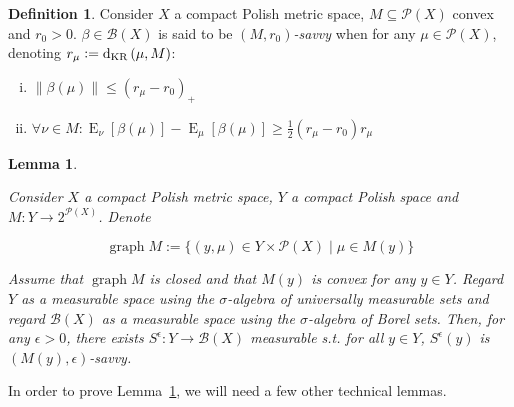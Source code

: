 \documentclass[11pt]{article}
\theoremstyle{definition}
\newtheorem{definition}{Definition}%
\theoremstyle{plain}
\newtheorem{lemma}{Lemma}%
\newcommand{\N}[1]{\lVert #1 \rVert}
\DeclareMathOperator{\E}{E}
\DeclareMathOperator{\Gr}{graph}
\newcommand{\PM}{\mathcal{P}}
\newcommand{\DKR}{\operatorname{d}_{\textnormal{KR}}}
\newcommand{\Gm}{\mathcal{B}}
\begin{document}
\begin{samepage}
\begin{definition}

Consider $X$ a compact Polish metric space, $M \subseteq \PM\left(X\right)$ convex and $r_0 > 0$. $\beta \in \Gm\left(X\right)$ is said to be \emph{$\left(M,r_0\right)$-savvy} when for any $\mu \in \PM\left(X\right)$, denoting $r_\mu:=\DKR\left(\mu,M\right)$:

\begin{enumerate}[i.]

\item $\N{\beta\left(\mu\right)} \leq \left(r_\mu - r_0\right)_+$
\item $\forall \nu \in M: \E_\nu\left[\beta\left(\mu\right)\right] - \E_\mu\left[\beta\left(\mu\right)\right] \geq \frac{1}{2}\left(r_\mu - r_0\right) r_\mu$

\end{enumerate}

\end{definition}
\end{samepage}

\begin{samepage}
\begin{lemma}
\label{lmm:savvy}

Consider $X$ a compact Polish metric space, $Y$ a compact Polish space and $M: Y \rightarrow 2^{\PM\left(X\right)}$. Denote

\begin{equation*}
\Gr{M}:=\{\left(y, \mu\right) \in Y \times \PM\left(X\right) \mid \mu \in M\left(y\right)\}
\end{equation*}

Assume that $\Gr{M}$ is closed and that $M\left(y\right)$ is convex for any $y \in Y$. Regard $Y$ as a measurable space using the $\sigma$-algebra of universally measurable sets and regard $\Gm\left(X\right)$ as a measurable space using the $\sigma$-algebra of Borel sets. Then, for any $\epsilon > 0$, there exists $S^\epsilon: Y \rightarrow \Gm\left(X\right)$ measurable s.t. for all $y \in Y$, $S^\epsilon\left(y\right)$ is $\left(M\left(y\right),\epsilon\right)$-savvy.

\end{lemma}
\end{samepage}

In order to prove Lemma~\ref{lmm:savvy}, we will need a few other technical lemmas.
\end{document}
